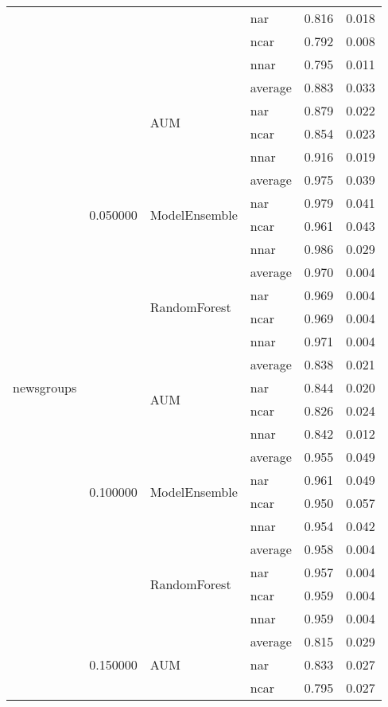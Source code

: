\begin{longtable}{llllrr}
 &  &  & nar & 0.816 & 0.018 \\
 &  &  & ncar & 0.792 & 0.008 \\
 &  &  & nnar & 0.795 & 0.011 \\
\cline{1-6} \cline{2-6} \cline{3-6}
\multirow[t]{120}{*}{newsgroups} & \multirow[t]{12}{*}{0.050000} & \multirow[t]{4}{*}{AUM} & average & 0.883 & 0.033 \\
 &  &  & nar & 0.879 & 0.022 \\
 &  &  & ncar & 0.854 & 0.023 \\
 &  &  & nnar & 0.916 & 0.019 \\
\cline{3-6}
 &  & \multirow[t]{4}{*}{ModelEnsemble} & average & 0.975 & 0.039 \\
 &  &  & nar & 0.979 & 0.041 \\
 &  &  & ncar & 0.961 & 0.043 \\
 &  &  & nnar & 0.986 & 0.029 \\
\cline{3-6}
 &  & \multirow[t]{4}{*}{RandomForest} & average & 0.970 & 0.004 \\
 &  &  & nar & 0.969 & 0.004 \\
 &  &  & ncar & 0.969 & 0.004 \\
 &  &  & nnar & 0.971 & 0.004 \\
\cline{2-6} \cline{3-6}
 & \multirow[t]{12}{*}{0.100000} & \multirow[t]{4}{*}{AUM} & average & 0.838 & 0.021 \\
 &  &  & nar & 0.844 & 0.020 \\
 &  &  & ncar & 0.826 & 0.024 \\
 &  &  & nnar & 0.842 & 0.012 \\
\cline{3-6}
 &  & \multirow[t]{4}{*}{ModelEnsemble} & average & 0.955 & 0.049 \\
 &  &  & nar & 0.961 & 0.049 \\
 &  &  & ncar & 0.950 & 0.057 \\
 &  &  & nnar & 0.954 & 0.042 \\
\cline{3-6}
 &  & \multirow[t]{4}{*}{RandomForest} & average & 0.958 & 0.004 \\
 &  &  & nar & 0.957 & 0.004 \\
 &  &  & ncar & 0.959 & 0.004 \\
 &  &  & nnar & 0.959 & 0.004 \\
\cline{2-6} \cline{3-6}
 & \multirow[t]{12}{*}{0.150000} & \multirow[t]{4}{*}{AUM} & average & 0.815 & 0.029 \\
 &  &  & nar & 0.833 & 0.027 \\
 &  &  & ncar & 0.795 & 0.027 \\

\end{longtable}

